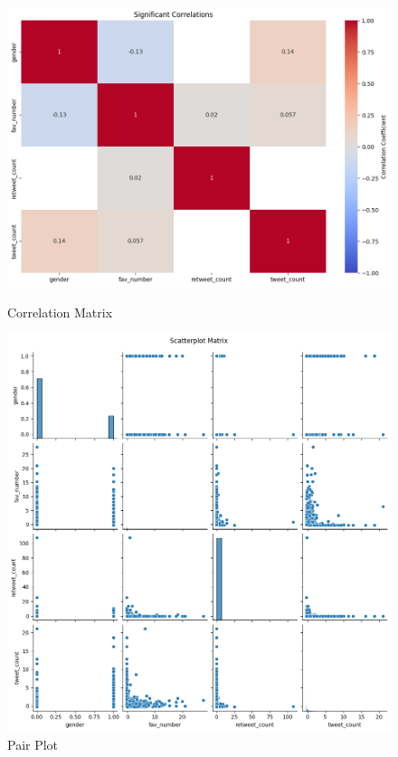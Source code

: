 \documentclass[a4paper,11pt]{article}
\begin{document}
\begin{figure}[h!]
    \centering
    \begin{minipage}{0.45\textwidth}
        \centering
        \includegraphics[width=\textwidth]{corr_a2.png}
        \caption{Correlation Matrix}
        \label{fig:corr}
    \end{minipage}
    \hfill
    \begin{minipage}{0.45\textwidth}
        \centering
        \includegraphics[width=\textwidth]{pair_plot_a2.png}
        \caption{Pair Plot}
        \label{fig:p_plot}
    \end{minipage}
\end{figure}
\end{document}
